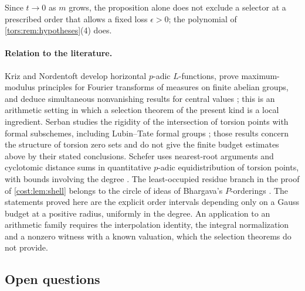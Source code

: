 Since $t\to0$ as $m$ grows, the proposition alone does not exclude a selector at a
prescribed order that allows a fixed loss $\epsilon>0$; the polynomial of
\cref{tors:rem:hypotheses}(4) does.

\paragraph{Relation to the literature.}
Kriz and Nordentoft develop horizontal $p$-adic $L$-functions, prove maximum-modulus
principles for Fourier transforms of measures on finite abelian groups, and deduce
simultaneous nonvanishing results for central values
\cite{KrizNordentoft2023Horizontal}; this is an arithmetic setting in which a selection
theorem of the present kind is a local ingredient. Serban studies the rigidity of the
intersection of torsion points with formal subschemes, including Lubin--Tate formal
groups \cite{Serban2018Infinitesimal,Serban2022Padic}; those results concern the structure
of torsion zero sets and do not give the finite budget estimates above by their stated
conclusions. Schefer uses nearest-root arguments and cyclotomic distance sums in
quantitative $p$-adic equidistribution of torsion points, with bounds involving the degree
\cite{Schefer2024Padic}. The least-occupied residue branch in the proof of
\cref{cost:lem:shell} belongs to the circle of ideas of Bhargava's $P$-orderings
\cite{Bhargava1997Porderings,Bhargava2009Porderings}. The statements proved here are the
explicit order intervals depending only on a Gauss budget at a positive radius, uniformly
in the degree. An application to an arithmetic family requires the interpolation
identity, the integral normalization and a nonzero witness with a known valuation, which
the selection theorems do not provide.

\subsection{Open questions}\label{tors:sec:open}\label{cost:sec:open}
{\raggedright{}}

